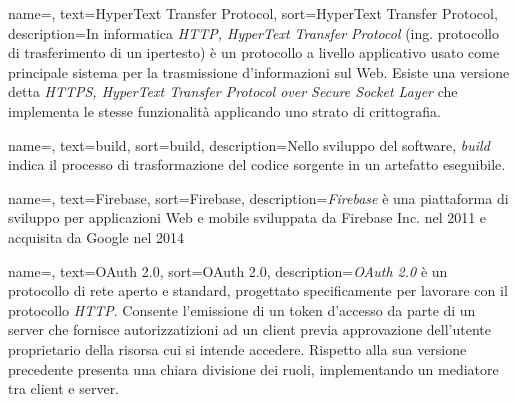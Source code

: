 {
	name=,
	text=HyperText Transfer Protocol,
	sort=HyperText Transfer Protocol,
	description={In informatica \emph{HTTP, HyperText Transfer Protocol} (ing. protocollo di trasferimento di un ipertesto) è un protocollo a livello applicativo usato come principale sistema per la trasmissione d'informazioni sul Web. Esiste una versione detta \emph{HTTPS, HyperText Transfer Protocol over Secure Socket Layer} che implementa le stesse funzionalità applicando uno strato di crittografia.}
}

{
	name=,
	text=build,
	sort=build,
	description={Nello sviluppo del software, \emph{build} indica il processo di trasformazione del codice sorgente in un artefatto eseguibile.}
}

{
	name=,
	text=Firebase,
	sort=Firebase,
	description={\emph{Firebase} è una piattaforma di sviluppo per applicazioni Web e mobile sviluppata da Firebase Inc. nel 2011 e acquisita da Google nel 2014}
}

{
	name=,
	text=OAuth 2.0,
	sort=OAuth 2.0,
	description={\emph{OAuth 2.0} è un protocollo di rete aperto e standard, progettato specificamente per lavorare con il protocollo \emph{HTTP}. Consente l'emissione di un token d'accesso da parte di un server che fornisce autorizzatizioni ad un client previa approvazione dell'utente proprietario della risorsa cui si intende accedere. Rispetto alla sua versione precedente presenta una chiara divisione dei ruoli, implementando un mediatore tra client e server.}
}

